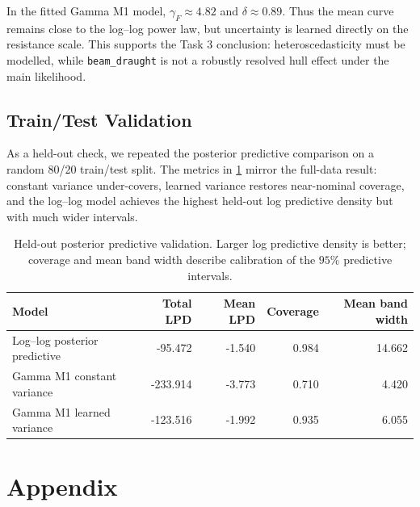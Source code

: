 \documentclass[12pt,a4paper]{article}
\begin{document}
In the fitted Gamma M1 model, $\gamma_F\approx4.82$ and $\delta\approx0.89$.
Thus the mean curve remains close to the log--log power law, but uncertainty is
learned directly on the resistance scale. This supports the Task 3 conclusion:
heteroscedasticity must be modelled, while \texttt{beam\_draught} is not a
robustly resolved hull effect under the main likelihood.

\subsection{Train/Test Validation}
\label{sec:validation}

As a held-out check, we repeated the posterior predictive comparison on a random
80/20 train/test split. The metrics in \cref{tab:validation_metrics} mirror the
full-data result: constant variance under-covers, learned variance restores
near-nominal coverage, and the log--log model achieves the highest held-out log
predictive density but with much wider intervals.

\begin{table}[H]
	\centering
	\caption{Held-out posterior predictive validation. Larger log predictive
		density is better; coverage and mean band width describe calibration of the
		$95\%$ predictive intervals.}
	\label{tab:validation_metrics}
	\begin{tabular}{lrrrr}
		\toprule
		Model & Total LPD & Mean LPD & Coverage & Mean band width \\
		\midrule
		Log--log posterior predictive & -95.472 & -1.540 & 0.984 & 14.662 \\
		Gamma M1 constant variance & -233.914 & -3.773 & 0.710 & 4.420 \\
		Gamma M1 learned variance & -123.516 & -1.992 & 0.935 & 6.055 \\
		\bottomrule
	\end{tabular}
\end{table}

\clearpage
\printbibliography[heading=bibintoc, title = {References}]

\clearpage
\appendix
\renewcommand{\thetable}{\thesection.\arabic{table}}
\renewcommand{\thefigure}{\thesection.\arabic{figure}}
\setcounter{table}{0}
\setcounter{figure}{0}
\section{Appendix}
\label{app:tables}
\end{document}

